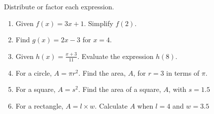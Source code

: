 \documentclass[12pt, oneside]{article}
\begin{document}
Distribute or factor each expression.
\begin{enumerate}
  \subsubsection*{Factoring Fridays}


\newpage
  \item Given $f(x)=3x+1$. Simplify $f(2)$. \vspace{2cm}
  \item Find $g(x)=2x-3$ for $x=4$. \vspace{2.5cm}
  \item Given $\displaystyle h(x)=\frac{x+3}{11}$. Evaluate the expression $h(8)$. \vspace{5cm}

  \item For a circle, $A=\pi r^2$. Find the area, $A$, for $r=3$ in terms of $\pi$. \vspace{2.5cm}
  \item For a square, $A=s^2$. Find the area of a square, $A$, with $s=1.5$ \vspace{2.5cm}
  \item For a rectangle, $A=l \times w$. Calculate $A$ when $l=4$ and $w=3.5$


\end{enumerate}
\end{document}
